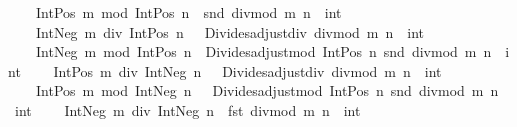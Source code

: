 \begin{isabellebody}
\ \ \ \ {\isachardoublequoteopen}Int{\isachardot}{\kern0pt}Pos\ m\ mod\ Int{\isachardot}{\kern0pt}Pos\ n\ {\isacharequal}{\kern0pt}\ {\isacharparenleft}{\kern0pt}snd\ {\isacharparenleft}{\kern0pt}divmod\ m\ n{\isacharparenright}{\kern0pt}\ {\isacharcolon}{\kern0pt}{\isacharcolon}{\kern0pt}\ int{\isacharparenright}{\kern0pt}{\isachardoublequoteclose}\isanewline
\ \ \ \ {\isachardoublequoteopen}Int{\isachardot}{\kern0pt}Neg\ m\ div\ Int{\isachardot}{\kern0pt}Pos\ n\ {\isacharequal}{\kern0pt}\ {\isacharminus}{\kern0pt}\ {\isacharparenleft}{\kern0pt}Divides{\isachardot}{\kern0pt}adjust{\isacharunderscore}{\kern0pt}div\ {\isacharparenleft}{\kern0pt}divmod\ m\ n{\isacharparenright}{\kern0pt}\ {\isacharcolon}{\kern0pt}{\isacharcolon}{\kern0pt}\ int{\isacharparenright}{\kern0pt}{\isachardoublequoteclose}\isanewline
\ \ \ \ {\isachardoublequoteopen}Int{\isachardot}{\kern0pt}Neg\ m\ mod\ Int{\isachardot}{\kern0pt}Pos\ n\ {\isacharequal}{\kern0pt}\ Divides{\isachardot}{\kern0pt}adjust{\isacharunderscore}{\kern0pt}mod\ {\isacharparenleft}{\kern0pt}Int{\isachardot}{\kern0pt}Pos\ n{\isacharparenright}{\kern0pt}\ {\isacharparenleft}{\kern0pt}snd\ {\isacharparenleft}{\kern0pt}divmod\ m\ n{\isacharparenright}{\kern0pt}\ {\isacharcolon}{\kern0pt}{\isacharcolon}{\kern0pt}\ int{\isacharparenright}{\kern0pt}{\isachardoublequoteclose}\isanewline
\ \ \ \ {\isachardoublequoteopen}Int{\isachardot}{\kern0pt}Pos\ m\ div\ Int{\isachardot}{\kern0pt}Neg\ n\ {\isacharequal}{\kern0pt}\ {\isacharminus}{\kern0pt}\ {\isacharparenleft}{\kern0pt}Divides{\isachardot}{\kern0pt}adjust{\isacharunderscore}{\kern0pt}div\ {\isacharparenleft}{\kern0pt}divmod\ m\ n{\isacharparenright}{\kern0pt}\ {\isacharcolon}{\kern0pt}{\isacharcolon}{\kern0pt}\ int{\isacharparenright}{\kern0pt}{\isachardoublequoteclose}\isanewline
\ \ \ \ {\isachardoublequoteopen}Int{\isachardot}{\kern0pt}Pos\ m\ mod\ Int{\isachardot}{\kern0pt}Neg\ n\ {\isacharequal}{\kern0pt}\ {\isacharminus}{\kern0pt}\ Divides{\isachardot}{\kern0pt}adjust{\isacharunderscore}{\kern0pt}mod\ {\isacharparenleft}{\kern0pt}Int{\isachardot}{\kern0pt}Pos\ n{\isacharparenright}{\kern0pt}\ {\isacharparenleft}{\kern0pt}snd\ {\isacharparenleft}{\kern0pt}divmod\ m\ n{\isacharparenright}{\kern0pt}\ {\isacharcolon}{\kern0pt}{\isacharcolon}{\kern0pt}\ int{\isacharparenright}{\kern0pt}{\isachardoublequoteclose}\isanewline
\ \ \ \ {\isachardoublequoteopen}Int{\isachardot}{\kern0pt}Neg\ m\ div\ Int{\isachardot}{\kern0pt}Neg\ n\ {\isacharequal}{\kern0pt}\ {\isacharparenleft}{\kern0pt}fst\ {\isacharparenleft}{\kern0pt}divmod\ m\ n{\isacharparenright}{\kern0pt}\ {\isacharcolon}{\kern0pt}{\isacharcolon}{\kern0pt}\ int{\isacharparenright}{\kern0pt}{\isachardoublequoteclose}\isanewline

\end{isabellebody}
